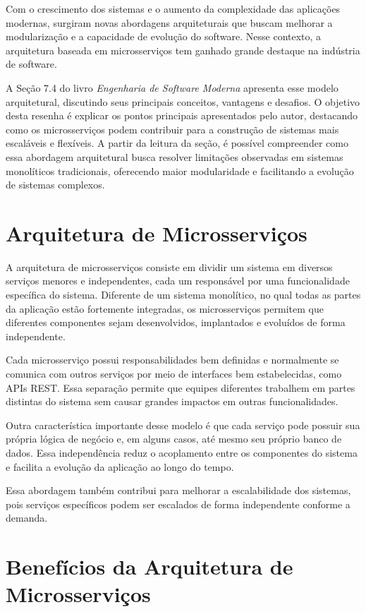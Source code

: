 \documentclass[conference]{IEEEtran}
\begin{document}
Com o crescimento dos sistemas e o aumento da complexidade das aplicações modernas, surgiram novas abordagens arquiteturais que buscam melhorar a modularização e a capacidade de evolução do software. Nesse contexto, a arquitetura baseada em microsserviços tem ganhado grande destaque na indústria de software.

A Seção 7.4 do livro \textit{Engenharia de Software Moderna} apresenta esse modelo arquitetural, discutindo seus principais conceitos, vantagens e desafios. O objetivo desta resenha é explicar os pontos principais apresentados pelo autor, destacando como os microsserviços podem contribuir para a construção de sistemas mais escaláveis e flexíveis. A partir da leitura da seção, é possível compreender como essa abordagem arquitetural busca resolver limitações observadas em sistemas monolíticos tradicionais, oferecendo maior modularidade e facilitando a evolução de sistemas complexos.

\section{Arquitetura de Microsserviços}

A arquitetura de microsserviços consiste em dividir um sistema em diversos serviços menores e independentes, cada um responsável por uma funcionalidade específica do sistema. Diferente de um sistema monolítico, no qual todas as partes da aplicação estão fortemente integradas, os microsserviços permitem que diferentes componentes sejam desenvolvidos, implantados e evoluídos de forma independente.

Cada microsserviço possui responsabilidades bem definidas e normalmente se comunica com outros serviços por meio de interfaces bem estabelecidas, como APIs REST. Essa separação permite que equipes diferentes trabalhem em partes distintas do sistema sem causar grandes impactos em outras funcionalidades.

Outra característica importante desse modelo é que cada serviço pode possuir sua própria lógica de negócio e, em alguns casos, até mesmo seu próprio banco de dados. Essa independência reduz o acoplamento entre os componentes do sistema e facilita a evolução da aplicação ao longo do tempo.

Essa abordagem também contribui para melhorar a escalabilidade dos sistemas, pois serviços específicos podem ser escalados de forma independente conforme a demanda.

\section{Benefícios da Arquitetura de Microsserviços}
\end{document}

